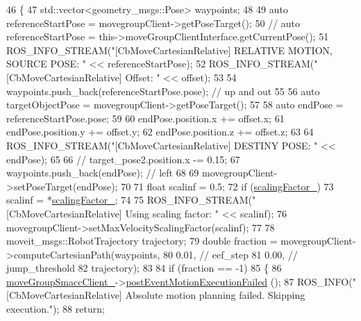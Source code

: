 \begin{DoxyCode}
46 \{
47   std::vector<geometry\_msgs::Pose> waypoints;
48 
49   \textcolor{keyword}{auto} referenceStartPose = movegroupClient->getPoseTarget();
50   \textcolor{comment}{// auto referenceStartPose = this->moveGroupClientInterface.getCurrentPose();}
51   ROS\_INFO\_STREAM(\textcolor{stringliteral}{"[CbMoveCartesianRelative] RELATIVE MOTION, SOURCE POSE: "} << referenceStartPose);
52   ROS\_INFO\_STREAM(\textcolor{stringliteral}{"[CbMoveCartesianRelative] Offset: "} << offset);
53 
54   waypoints.push\_back(referenceStartPose.pose);  \textcolor{comment}{// up and out}
55 
56   \textcolor{keyword}{auto} targetObjectPose = movegroupClient->getPoseTarget();
57 
58   \textcolor{keyword}{auto} endPose = referenceStartPose.pose;
59 
60   endPose.position.x += offset.x;
61   endPose.position.y += offset.y;
62   endPose.position.z += offset.z;
63 
64   ROS\_INFO\_STREAM(\textcolor{stringliteral}{"[CbMoveCartesianRelative] DESTINY POSE: "} << endPose);
65 
66   \textcolor{comment}{// target\_pose2.position.x -= 0.15;}
67   waypoints.push\_back(endPose);  \textcolor{comment}{// left}
68 
69   movegroupClient->setPoseTarget(endPose);
70 
71   \textcolor{keywordtype}{float} scalinf = 0.5;
72   \textcolor{keywordflow}{if} (\hyperlink{classmoveit__z__client_1_1CbMoveCartesianRelative_a0d483fda685fe6ef7e68240ae5b2140d}{scalingFactor\_})
73     scalinf = *\hyperlink{classmoveit__z__client_1_1CbMoveCartesianRelative_a0d483fda685fe6ef7e68240ae5b2140d}{scalingFactor\_};
74 
75   ROS\_INFO\_STREAM(\textcolor{stringliteral}{"[CbMoveCartesianRelative] Using scaling factor: "} << scalinf);
76   movegroupClient->setMaxVelocityScalingFactor(scalinf);
77 
78   moveit\_msgs::RobotTrajectory trajectory;
79   \textcolor{keywordtype}{double} fraction = movegroupClient->computeCartesianPath(waypoints,
80                                                           0.01,  \textcolor{comment}{// eef\_step}
81                                                           0.00,  \textcolor{comment}{// jump\_threshold}
82                                                           trajectory);
83 
84   \textcolor{keywordflow}{if} (fraction == -1)
85   \{
86     \hyperlink{classmoveit__z__client_1_1CbMoveCartesianRelative_abe1a99706adf6cb61aacb034e0b6a4c9}{moveGroupSmaccClient\_}->\hyperlink{classmoveit__z__client_1_1ClMoveGroup_a42bede73264ae2d5dfe0117315042acb}{postEventMotionExecutionFailed}
      ();
87     ROS\_INFO(\textcolor{stringliteral}{"[CbMoveCartesianRelative] Absolute motion planning failed. Skipping execution."});
88     \textcolor{keywordflow}{return};

\end{DoxyCode}
